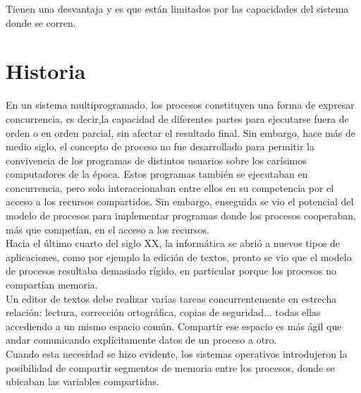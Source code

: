 \documentclass{report}   %
\begin{document}
Tienen una desvantaja y es que están limitados por las capacidades del sistema donde se corren.

\section*{Historia}
En un sistema multiprogramado, los procesos constituyen una forma de expresar concurrencia, es decir,la capacidad de diferentes partes para ejecutarse fuera de orden o en orden parcial, sin afectar el resultado final. Sin embargo, hace más de medio siglo, el concepto de proceso no fue desarrollado para permitir la convivencia de los programas de distintos usuarios sobre los carísimos computadores de la época. Estos programas también se ejecutaban en concurrencia, pero solo interaccionaban entre ellos en su competencia por el acceso a los recursos compartidos. Sin embargo, enseguida se vio el potencial del modelo de procesos para implementar programas donde los procesos cooperaban, más que competían, en el acceso a los recursos.\\

Hacia el último cuarto del siglo XX, la informática se abrió a nuevos tipos de aplicaciones, como por ejemplo la edición de textos, pronto se vio que el modelo de procesos resultaba demasiado rígido, en particular porque los procesos no compartían memoria.\\
 Un editor de textos debe realizar varias tareas concurrentemente en estrecha relación: lectura, corrección ortográfica, copias de seguridad... 
todas ellas accediendo a un mismo espacio común. Compartir ese espacio es más ágil que andar comunicando explícitamente datos de un proceso a otro. \\ Cuando esta necesidad se hizo evidente, los sistemas operativos introdujeron la posibilidad de compartir segmentos de memoria entre los procesos, donde se ubicaban las variables compartidas. \\
\end{document}
